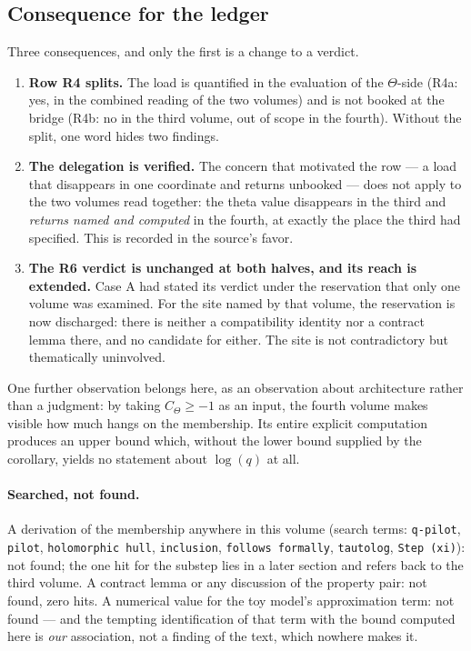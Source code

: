 \documentclass[11pt,a4paper]{article}
\theoremstyle{definition}
\begin{document}
\subsection{Consequence for the ledger}

Three consequences, and only the first is a change to a verdict.

\begin{enumerate}
\item \textbf{Row R4 splits.} The load is quantified in the evaluation of the
  $\Theta$-side (R4a: yes, in the combined reading of the two volumes) and is not
  booked at the bridge (R4b: no in the third volume, out of scope in the fourth).
  Without the split, one word hides two findings.
\item \textbf{The delegation is verified.} The concern that motivated the row ---
  a load that disappears in one coordinate and returns unbooked --- does not apply
  to the two volumes read together: the theta value disappears in the third and
  \emph{returns named and computed} in the fourth, at exactly the place the third
  had specified. This is recorded in the source's favor.
\item \textbf{The R6 verdict is unchanged at both halves, and its reach is
  extended.} Case A had stated its verdict under the reservation that only one
  volume was examined. For the site named by that volume, the reservation is now
  discharged: there is neither a compatibility identity nor a contract lemma
  there, and no candidate for either. The site is not contradictory but
  thematically uninvolved.
\end{enumerate}

One further observation belongs here, as an observation about architecture rather
than a judgment: by taking $C_\Theta \ge -1$ as an input, the fourth volume makes
visible how much hangs on the membership. Its entire explicit computation produces
an upper bound which, without the lower bound supplied by the corollary, yields no
statement about $\log(q)$ at all.

\paragraph{Searched, not found.} A derivation of the membership anywhere in this
volume (search terms: \texttt{q-pilot}, \texttt{pilot}, \texttt{holomorphic hull},
\texttt{inclusion}, \texttt{follows formally}, \texttt{tautolog},
\texttt{Step (xi)}): not found; the one hit for the substep lies in a later
section and refers back to the third volume. A contract lemma or any discussion of
the property pair: not found, zero hits. A numerical value for the toy model's
approximation term: not found --- and the tempting identification of that term
with the bound computed here is \emph{our} association, not a finding of the text,
which nowhere makes it.
\end{document}
